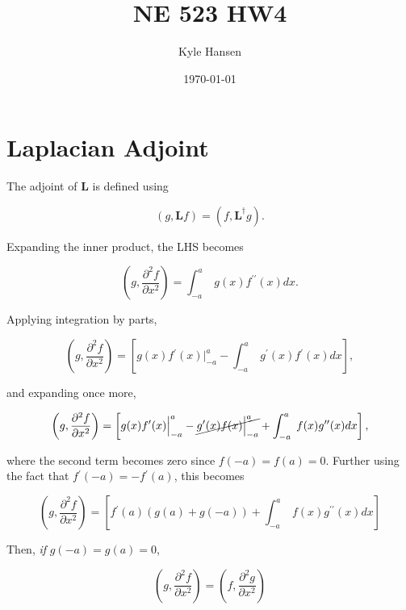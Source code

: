 \documentclass{hw-template}
\date{\today}
\author{Kyle Hansen}
\title{NE 523 HW4}
\newcommand{\p}{\ensuremath{^{\prime}}}
\begin{document}
\maketitle

\section{Laplacian Adjoint}


The adjoint of $\mathbf{L}$ is defined using

\begin{equation}
    \left(g, \mathbf{L}f\right) = \left(f, \mathbf{L}^\dagger g\right).
\end{equation}

Expanding the inner product, the LHS becomes

\begin{equation}
    \left(g, \frac{\partial^2 f}{\partial x^2}\right) = \int_{-a}^{a}\; g(x)f^{\prime\prime}(x)dx.
\end{equation}

Applying integration by parts,

\begin{equation}
    \left(g, \frac{\partial^2 f}{\partial x^2}\right) = \left[ g(x) f\p(x)\Big|_{-a}^a -     \int_{-a}^{a}\; g\p(x)f\p(x)dx   \right],
\end{equation}

and expanding once more,

\begin{equation}
    \left(g, \frac{\partial^2 f}{\partial x^2}\right) = \left[ g(x) f\p(x)\Big|_{-a}^a -     \cancel{g\p(x)f(x)\Big|_{-a}^a} + \int_{-a}^{a}\; f(x) g^{\prime\prime}(x) dx  \right],
\end{equation}

where the second term becomes zero since $f(-a) = f(a) = 0$. Further using the fact that $f\p(-a) = -f\p(a)$, this becomes

\begin{equation}
    \left(g, \frac{\partial^2 f}{\partial x^2}\right) = \left[ f\p(a)\left(g(a) + g(-a) \right) + \int_{-a}^{a}\; f(x) g^{\prime\prime}(x) dx  \right]
\end{equation}

Then, \textit{if} $g(-a) = g(a) =0$, 

\begin{equation}
    \left(g, \frac{\partial^2 f}{\partial x^2}\right) = \left(f, \frac{\partial^2 g}{\partial x^2}\right)
\end{equation}
\end{document}

